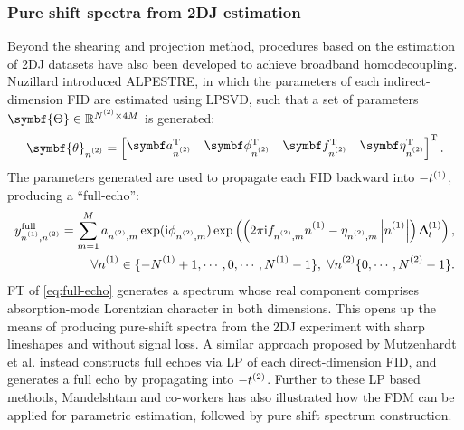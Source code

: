 \subsubsection{Pure shift spectra from 2DJ estimation}
Beyond the shearing and projection method, procedures based on the estimation
of \ac{2DJ} datasets have also been developed to achieve broadband
homodecoupling. Nuzillard introduced
\ac{ALPESTRE}\cite{Nuzillard1996,Martinez2012}, in which the parameters of each
indirect-dimension FID are estimated using \ac{LPSVD}, such that a set of
parameters $\symbf{\Theta} \in \mathbb{R}^{\Ntwo \times 4M}$ is generated:
\begin{equation}
    \symbf{\theta}_{\ntwo} =
    \begin{bmatrix}
        \bda_{\ntwo}\T &
        \bdphi_{\ntwo}\T &
        \bdf_{\ntwo}\T &
        \bdeta_{\ntwo}\T
    \end{bmatrix}\T.
\end{equation}
The parameters generated are used to propagate each FID backward into
$-t^{(1)}$, producing a ``full-echo'':
\begin{equation}
    \begin{split}
        y^{\text{full}}_{\none,\ntwo} = \sum_{m=1}^{M}
            a_{\ntwo,m}
            \exp(\iu \phi_{\ntwo,m})
            \exp\left(\left(2 \pi \iu f_{\ntwo,m} \none
            -\eta_{\ntwo,m}  \left\lvert \none \right\rvert \right)\Dtone\right), \\
        \forall \none \in \lbrace -\None + 1, \cdots, 0, \cdots, \None - 1 \rbrace,\ \forall \ntwo \lbrace 0, \cdots, \Ntwo - 1 \rbrace.
    \end{split}
    \label{eq:full-echo}
\end{equation}
\ac{FT} of \cref{eq:full-echo} generates a spectrum whose real component
comprises absorption-mode
Lorentzian character in both dimensions. This opens up the means of producing
pure-shift spectra from the \ac{2DJ} experiment with sharp lineshapes and
without signal loss. A similar approach proposed by Mutzenhardt et al.
instead constructs full echoes via \ac{LP} of each direct-dimension
\ac{FID}, and generates a full echo by propagating into
$-t^{(2)}$\cite{Mutzenhardt1999}. Further to these \ac{LP} based methods,
Mandelshtam and co-workers has also illustrated how the \ac{FDM} can be applied
for parametric estimation, followed by pure shift spectrum
construction\cite{Mandelshtam1997,Mandelshtam1998}.

